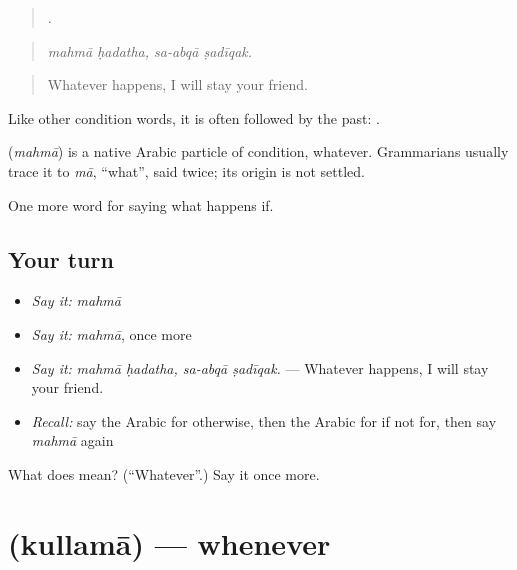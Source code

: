 \begin{quote}
   .
\end{quote}

\begin{quote}
\emph{mahmā ḥadatha, sa-abqā ṣadīqak.}
\end{quote}

\begin{quote}
Whatever happens, I will stay your friend.
\end{quote}

Like other condition words, it is often followed by the past:  .

\begin{cousinweb}
\textbf{} (\emph{mahmā}) is a native Arabic particle of condition, whatever. Grammarians usually trace it to \emph{mā}, \textquotedblleft{}what\textquotedblright{}, said twice; its origin is not settled.
\end{cousinweb}

\begin{grammarlens}[title={What you've built}]
One more word for saying what happens if.
\end{grammarlens}

\subsection*{Your turn}
\begin{itemize}
\raggedright
  \item \emph{Say it:} \emph{mahmā}
  \item \emph{Say it:} \emph{mahmā}, once more
  \item \emph{Say it:} \emph{mahmā ḥadatha, sa-abqā ṣadīqak.} — Whatever happens, I will stay your friend.
  \item \emph{Recall:} say the Arabic for otherwise, then the Arabic for if not for, then say \emph{mahmā} again
\end{itemize}

\begin{tcolorbox}[breakable,colback=teal!4,colframe=teal!35!black,title={Before you move on}]
What does  mean? (\textquotedblleft{}Whatever\textquotedblright{}.) Say it once more.
\end{tcolorbox}
\section[\texorpdfstring{\ar{كلما} (kullamā)}{كلما (kullamā)}]{ (kullamā) — whenever}

